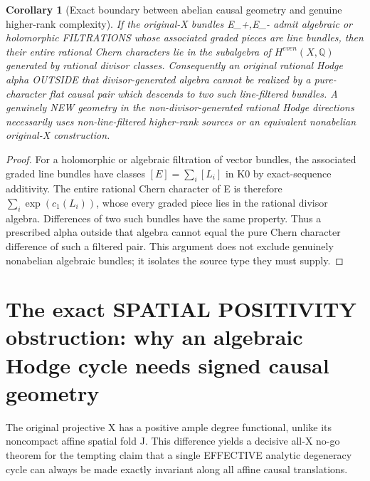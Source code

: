 \documentclass[11pt]{article}
\newtheorem{corollary}[theorem]{Corollary}
\begin{document}
\begin{corollary}[Exact boundary between abelian causal geometry and genuine higher-rank complexity]
If the original-X bundles E_+,E_-
admit algebraic or holomorphic
FILTRATIONS whose associated
graded pieces are line bundles,
then their entire rational Chern
characters lie in the
subalgebra of $H^{even}(X,\mathbb Q)$
generated by rational divisor classes.
Consequently an original rational
Hodge alpha OUTSIDE that
divisor-generated algebra cannot
be realized by a pure-character
flat causal pair which descends
to two such line-filtered bundles.
A genuinely NEW geometry in the
non-divisor-generated rational
Hodge directions necessarily
uses non-line-filtered higher-rank
sources or an equivalent
nonabelian original-X construction.
\end{corollary}
\begin{proof}
For a holomorphic or algebraic
filtration of vector bundles,
the associated graded line
bundles have classes
$[E]=\sum_i[L_i]$ in K0
by exact-sequence additivity.
The entire rational Chern
character of E is therefore
$\sum_i\exp(c_1(L_i))$,
whose every graded piece lies
in the rational divisor algebra.
Differences of two such bundles
have the same property.
Thus a prescribed alpha
outside that algebra cannot
equal the pure Chern character
difference of such a filtered
pair. This argument does not
exclude genuinely nonabelian
algebraic bundles; it isolates
the source type they must supply.
\end{proof}

\section{The exact SPATIAL POSITIVITY obstruction: why an algebraic Hodge cycle needs signed causal geometry}

The original projective X has a
positive ample degree functional,
unlike its noncompact affine
spatial fold J. This difference
yields a decisive all-X no-go
theorem for the tempting claim
that a single EFFECTIVE analytic
degeneracy cycle can always be
made exactly invariant along
all affine causal translations.
\end{document}

